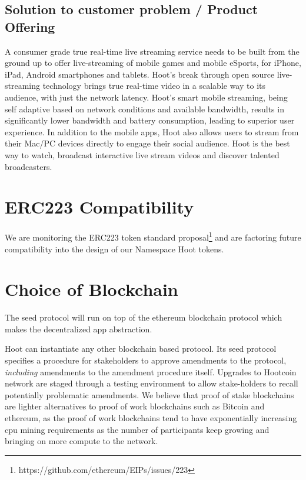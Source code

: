\documentclass{article}
\begin{document}
\subsection{Solution to customer problem / Product Offering}
A consumer grade true real-time live streaming service needs to be
built from the ground up to offer live-streaming of mobile games and
mobile eSports, for iPhone, iPad, Android smartphones and
tablets. Hoot's break through open source live-streaming technology brings true real-time video in a scalable way to its audience, with just the network latency. Hoot's smart mobile streaming, being self adaptive based on network conditions and available bandwidth, results in significantly lower bandwidth and battery consumption, leading to superior user experience. In addition to the mobile apps, Hoot also allows users to stream from their Mac/PC devices directly to engage their social audience. Hoot is the best way to watch, broadcast interactive live stream videos and discover talented broadcasters.

\section{ERC223 Compatibility}
We are monitoring the ERC223 token standard proposal\footnote{https://github.com/ethereum/EIPs/issues/223} and are factoring future compatibility into the design of our Namespace Hoot tokens.

\section{Choice of Blockchain}
The seed protocol will run on top of the ethereum blockchain protocol which makes the decentralized app abstraction. 



Hoot can instantiate any other blockchain based protocol. Its seed protocol specifies a procedure for stakeholders to approve amendments to the protocol,
\emph{including} amendments to the amendment procedure itself.
Upgrades to Hootcoin network are staged through a testing environment to allow stake-holders to recall potentially problematic amendments. We believe that proof of stake blockchains are lighter alternatives to proof of work blockchains such as Bitcoin and ethereum, as the proof of work blockchains tend to have exponentially increasing cpu mining requirements as the number of participants keep growing and bringing on more compute to the network.
\end{document}
